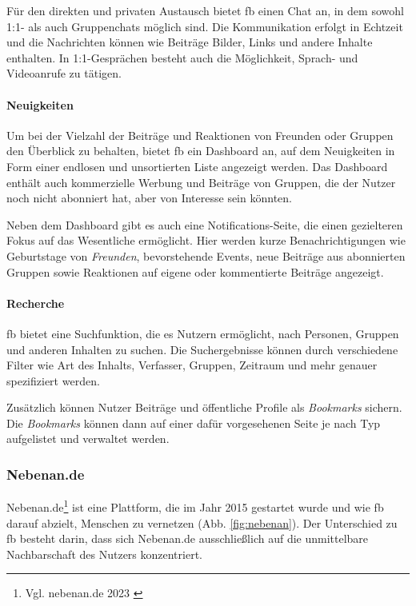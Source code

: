 Für den direkten und privaten Austausch bietet \acrshort{fb} einen Chat an, in dem sowohl 1:1- als auch Gruppenchats möglich sind. Die Kommunikation erfolgt in Echtzeit und die Nachrichten können wie Beiträge Bilder, Links und andere Inhalte enthalten. In 1:1-Gesprächen besteht auch die Möglichkeit, Sprach- und Videoanrufe zu tätigen.

\paragraph{Neuigkeiten}

Um bei der Vielzahl der Beiträge und Reaktionen von Freunden oder Gruppen den Überblick zu behalten, bietet \acrshort{fb} ein Dashboard an, auf dem Neuigkeiten in Form einer endlosen und unsortierten Liste angezeigt werden. Das Dashboard enthält auch kommerzielle Werbung und Beiträge von Gruppen, die der Nutzer noch nicht abonniert hat, aber von Interesse sein könnten.

Neben dem Dashboard gibt es auch eine Notifications-Seite, die einen gezielteren Fokus auf das Wesentliche ermöglicht. Hier werden kurze Benachrichtigungen wie Geburtstage von \textit{Freunden}, bevorstehende Events, neue Beiträge aus abonnierten Gruppen sowie Reaktionen auf eigene oder kommentierte Beiträge angezeigt.

\paragraph{Recherche}

\acrshort{fb} bietet eine Suchfunktion, die es Nutzern ermöglicht, nach Personen, Gruppen und anderen Inhalten zu suchen. Die Suchergebnisse können durch verschiedene Filter wie Art des Inhalts, Verfasser, Gruppen, Zeitraum und mehr genauer spezifiziert werden.

Zusätzlich können Nutzer Beiträge und öffentliche Profile als \textit{Bookmarks} sichern. Die \textit{Bookmarks} können dann auf einer dafür vorgesehenen Seite je nach Typ aufgelistet und verwaltet werden.

\subsubsection{Nebenan.de}

Nebenan.de\footnote{Vgl. nebenan.de 2023 \cite{nebenan}} ist eine Plattform, die im Jahr 2015 gestartet wurde und wie \acrshort{fb} darauf abzielt, Menschen zu vernetzen (Abb. \ref{fig:nebenan}). Der Unterschied zu \acrshort{fb} besteht darin, dass sich Nebenan.de ausschließlich auf die unmittelbare Nachbarschaft des Nutzers konzentriert.

